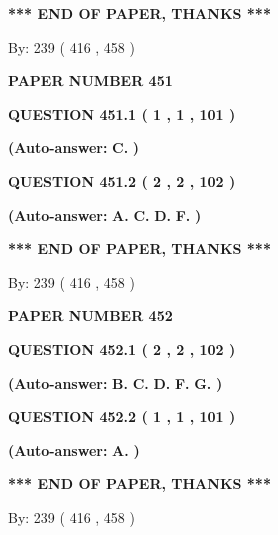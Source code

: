 \documentclass[12pt]{article}
\begin{document}
 
   
   
\vspace{1.0in} 
{\textbf{\large{ *** END OF PAPER, THANKS *** }}} 
   
   
\hspace{1.0in} By: 
 239 ( 416 ,  458 )
   
   
   
   
\newpage 
\setcounter{page}{ 
   451001 } 
   
   
 {\textbf{ \Large{ PAPER NUMBER  451  }}}
   
   
  
  
{\textbf{\large{QUESTION
451.1 
 ( 1 , 1 , 101 )
}}}
 
 
{\textbf{(Auto-answer:}}
{\textbf{\large{
C.}}}
{\textbf{)}}
 
 
  
  
{\textbf{\large{QUESTION
451.2 
 ( 2 , 2 , 102 )
}}}
 
 
{\textbf{(Auto-answer:}}
{\textbf{\large{
A.}}}
{\textbf{\large{
C.}}}
{\textbf{\large{
D.}}}
{\textbf{\large{
F.}}}
{\textbf{)}}
 
 
   
   
\vspace{1.0in} 
{\textbf{\large{ *** END OF PAPER, THANKS *** }}} 
   
   
\hspace{1.0in} By: 
 239 ( 416 ,  458 )
   
   
   
   
\newpage 
\setcounter{page}{ 
   452001 } 
   
   
 {\textbf{ \Large{ PAPER NUMBER  452  }}}
   
   
  
  
{\textbf{\large{QUESTION
452.1 
 ( 2 , 2 , 102 )
}}}
 
 
{\textbf{(Auto-answer:}}
{\textbf{\large{
B.}}}
{\textbf{\large{
C.}}}
{\textbf{\large{
D.}}}
{\textbf{\large{
F.}}}
{\textbf{\large{
G.}}}
{\textbf{)}}
 
 
  
  
{\textbf{\large{QUESTION
452.2 
 ( 1 , 1 , 101 )
}}}
 
 
{\textbf{(Auto-answer:}}
{\textbf{\large{
A.}}}
{\textbf{)}}
 
 
   
   
\vspace{1.0in} 
{\textbf{\large{ *** END OF PAPER, THANKS *** }}} 
   
   
\hspace{1.0in} By: 
 239 ( 416 ,  458 )
   
\end{document}
